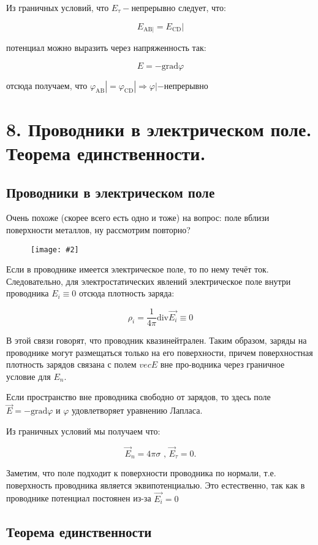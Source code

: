 \documentclass[a4paper,12pt]{article}
\newcommand{\fc}[1]{\[#1\]}
\newcommand{\mm}[1]{\mathrm{#1}}
\newcommand{\imc}[2][0.7\textwidth]{%
    \begin{figure}[h!]
        \centering
        \texttt{[image: \#2]}
    \end{figure}%
}
\begin{document}
Из граничных условий, что $E_{\tau}-$непрерывно следует, что:

\fc{E_{\text{AB}|} = E_{\text{CD}}|} 

потенциал можно выразить через напряженность так:

\fc{{E}=-\mm{grad}\varphi}

отсюда получаем, что $\varphi_{\text{AB}}|=\varphi_{\text{CD}}|\Rightarrow \varphi|-\text{непрерывно}$

\section*{8. Проводники в электрическом поле. Теорема единственности.}

\subsection*{Проводники в электрическом поле}

Очень похоже (скорее всего есть одно и тоже) на вопрос: поле вблизи поверхности металлов, ну рассмотрим повторно?

\imc[0.4\textwidth]{13.png}

\newpage

Если в проводнике имеется электрическое поле, то по нему течёт ток. Следовательно, для электростатических явлений электрическое поле внутри проводника $E_{i}\equiv0$ отсюда плотность заряда: 

\fc{\rho_i=\frac{1}{4\pi}\mm{div}\vec{E_i}\equiv0}

В этой связи говорят, что проводник квазинейтрален. Таким образом,
заряды на проводнике могут размещаться только на его поверхности,
причем поверхностная плотность зарядов связана с полем $vec{E}$ вне про-водника через граничное условие для $E_n$.

Если пространство вне проводника свободно от зарядов, то здесь поле 
$\vec{E}=-\mm{grad}\varphi$ и $\varphi$ удовлетворяет уравнению Лапласа.

Из граничных условий мы получаем что:

\fc{\vec{E}_{n}=4\pi \sigma \text{ , } \vec{E}_{\tau}=0 .}

Заметим, что поле подходит к поверхности проводника по нормали, т.е. поверхность
проводника является эквипотенциалью. Это естественно, так как в проводнике потенциал постоянен из-за $\vec{E_i}=0$

\subsection*{Теорема единственности}
\end{document}
